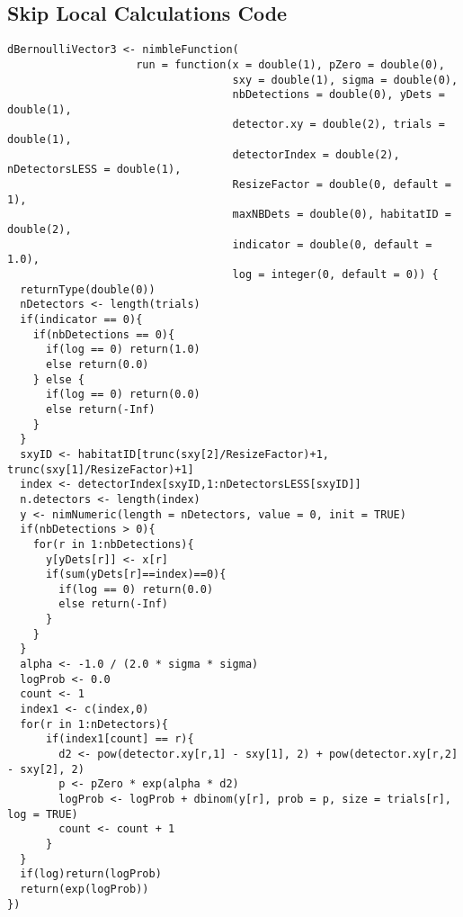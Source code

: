 \newpage
\subsection{Skip Local Calculations Code}

\begin{singlespace}
\begin{small}
\begin{verbatim}
dBernoulliVector3 <- nimbleFunction(
                    run = function(x = double(1), pZero = double(0),
                                   sxy = double(1), sigma = double(0),
                                   nbDetections = double(0), yDets = double(1),
                                   detector.xy = double(2), trials = double(1),
                                   detectorIndex = double(2), nDetectorsLESS = double(1),
                                   ResizeFactor = double(0, default = 1),
                                   maxNBDets = double(0), habitatID = double(2),
                                   indicator = double(0, default = 1.0),
                                   log = integer(0, default = 0)) {
  returnType(double(0))
  nDetectors <- length(trials)
  if(indicator == 0){
    if(nbDetections == 0){
      if(log == 0) return(1.0)
      else return(0.0)
    } else {
      if(log == 0) return(0.0)
      else return(-Inf)
    }
  }
  sxyID <- habitatID[trunc(sxy[2]/ResizeFactor)+1, trunc(sxy[1]/ResizeFactor)+1]
  index <- detectorIndex[sxyID,1:nDetectorsLESS[sxyID]]
  n.detectors <- length(index)
  y <- nimNumeric(length = nDetectors, value = 0, init = TRUE)
  if(nbDetections > 0){
    for(r in 1:nbDetections){
      y[yDets[r]] <- x[r] 
      if(sum(yDets[r]==index)==0){
        if(log == 0) return(0.0)
        else return(-Inf)
      } 
    } 
  }
  alpha <- -1.0 / (2.0 * sigma * sigma)
  logProb <- 0.0 
  count <- 1 
  index1 <- c(index,0) 
  for(r in 1:nDetectors){
      if(index1[count] == r){ 
        d2 <- pow(detector.xy[r,1] - sxy[1], 2) + pow(detector.xy[r,2] - sxy[2], 2)
        p <- pZero * exp(alpha * d2)
        logProb <- logProb + dbinom(y[r], prob = p, size = trials[r], log = TRUE)
        count <- count + 1
      }
  }
  if(log)return(logProb)
  return(exp(logProb))
})


\end{verbatim}
\end{small}
\end{singlespace}
